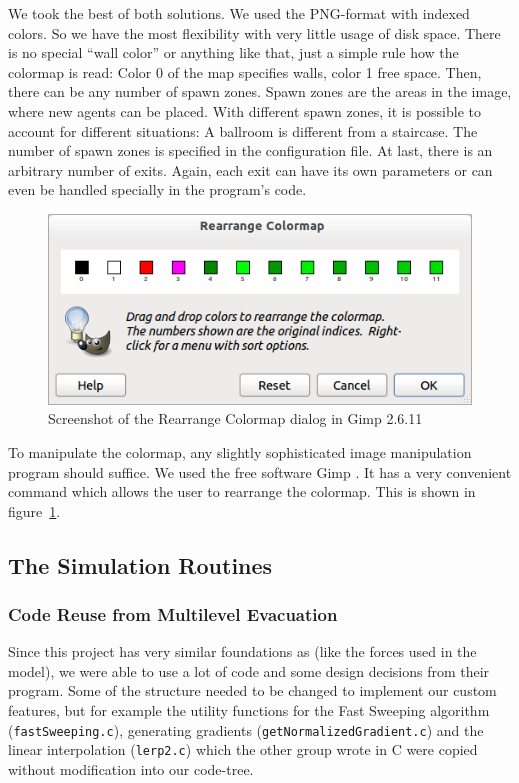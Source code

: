 \documentclass[11pt]{article}
\begin{document}
We took the best of both solutions. We used the PNG-format with indexed colors.
So we have the most flexibility with very little usage of disk space.  There is
no special ``wall color'' or anything like that, just a simple rule how the
colormap is read: Color 0 of the map specifies walls, color 1 free space.
Then, there can be any number of spawn zones.  Spawn zones are the areas in the
image, where new agents can be placed. With different spawn zones, it is
possible to account for different situations: A ballroom is different from a
staircase.  The number of spawn zones is specified in the configuration file.
At last, there is an arbitrary number of exits.  Again, each exit can have its
own parameters or can even be handled specially in the program's code. 

\begin{figure}[h]
	\centering
	\includegraphics[scale=0.5]{images/gimp.png}
	\caption{Screenshot of the Rearrange Colormap dialog in Gimp 2.6.11}
	\label{gimpscreenshot}
	
\end{figure}
To manipulate the colormap, any slightly sophisticated image manipulation
program should suffice. We used the free software Gimp \cite{gimp}. It has a
very convenient command which allows the user to rearrange the colormap. This
is shown in figure~\ref{gimpscreenshot}.

\subsection{The Simulation Routines}
\label{sub:The simulation Routines}

\subsubsection{Code Reuse from Multilevel Evacuation}

Since this project has very similar foundations as \cite{multilevel} (like the
forces used in the model), we were able to use a lot of code and some design
decisions from their program.  Some of the structure needed to be changed to
implement our custom features, but for example the utility functions for the
Fast Sweeping algorithm (\texttt{fastSweeping.c}), generating gradients
(\texttt{getNormalizedGradient.c}) and the linear interpolation
(\texttt{lerp2.c}) which the other group wrote in C were copied without
modification into our code-tree.
\end{document}
